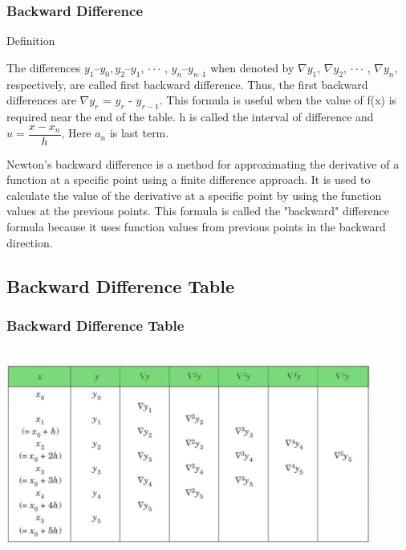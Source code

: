 \documentclass{beamer}
\begin{document}
\begin{frame}

\frametitle{Backward Difference}

\begin{block}{Definition}

The differences $y_1–y_0, y_2–y_1$, $\cdot\cdot\cdot$ , $y_n–y_{n –1}$ when denoted by $\nabla y_1$, $\nabla y_2$, $\cdot\cdot\cdot$ , $\nabla y_n$, respectively, are called first backward difference. Thus, the first backward differences are $\nabla y_{r}$ = $y_{r}$ - $y_{r - 1}$. This formula is useful when the value of f(x) is required near the end of the table. h is called
the interval of difference and $u = \dfrac{x-x_{n}}{h}$, Here $a_n$ is last term.

\end{block}

Newton's backward difference is a method for approximating the derivative of a function at a specific point using a finite difference approach. It is used to calculate the value of the derivative at a specific point by using the function values at the previous points. This formula is called the "backward" difference formula because it uses function values from previous points in the backward direction. 

\end{frame}

\subsection{Backward Difference Table} %

\begin{frame}

\frametitle{Backward Difference Table}
\begin{center}
\graphicspath{ {./pics/} }
\includegraphics[width=12cm, height=7cm]{latexImage_1b5b126b0fa71b41c779e83b060d4927}
\end{center}
\end{frame}
\end{document}
